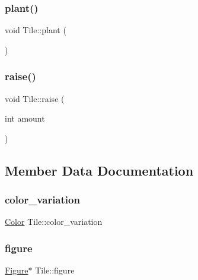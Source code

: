 \subsubsection{\texorpdfstring{plant()}{plant()}}
{\footnotesize\ttfamily void Tile\+::plant (\begin{DoxyParamCaption}{ }\end{DoxyParamCaption})\hspace{0.3cm}{\ttfamily [inline]}}

\mbox{\label{classTile_a2df9b57eb3fdba56aa69d989c18a7989}} 
\subsubsection{\texorpdfstring{raise()}{raise()}}
{\footnotesize\ttfamily void Tile\+::raise (\begin{DoxyParamCaption}\item[{int}]{amount }\end{DoxyParamCaption})\hspace{0.3cm}{\ttfamily [inline]}}



\subsection{Member Data Documentation}
\mbox{\label{classTile_abfdce38f0f708b67dd84e0992ebca268}} 
\subsubsection{\texorpdfstring{color\+\_\+variation}{color\_variation}}
{\footnotesize\ttfamily \hyperlink{structColor}{Color} Tile\+::color\+\_\+variation\hspace{0.3cm}{\ttfamily [private]}}

\mbox{\label{classTile_a96976c70d77812bcce266c00ba0513ee}} 
\subsubsection{\texorpdfstring{figure}{figure}}
{\footnotesize\ttfamily \hyperlink{classFigure}{Figure}$\ast$ Tile\+::figure\hspace{0.3cm}{\ttfamily [private]}}

